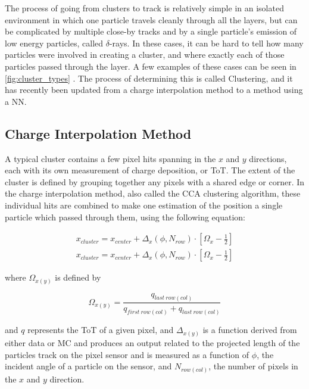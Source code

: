 The process of going from clusters to track is relatively simple in an isolated environment in which one particle travels cleanly through all the layers, but can be complicated by multiple close-by tracks and by a single particle's emission of low energy particles, called $\delta$-rays. In these cases, it can be hard to tell how many particles were involved in creating a cluster, and where exactly each of those particles passed through the layer. A few examples of these cases can be seen in \autoref{fig:cluster_types} . The process of determining this is called Clustering, and it has recently been updated from a charge interpolation method to a method using a \ac{NN}. 

\subsection{Charge Interpolation Method}

A typical cluster contains a few pixel hits spanning in the $x$ and $y$ directions, each with its own measurement of charge deposition, or \ac{ToT}. The extent of the cluster is defined by grouping together any pixels with a shared edge or corner. In the charge interpolation method, also called the \ac{CCA} clustering algorithm, these individual hits are combined to make one estimation of the position a single particle which passed through them, using the following equation: 

\begin{eqnarray}
x_{cluster} = x_{center} + \Delta_x(\phi,N_{row}) \cdot \left[ \Omega_x -\frac{1}{2} \right] \\
\label{eq:analogx}
x_{cluster} = x_{center} + \Delta_x(\phi,N_{row}) \cdot \left[ \Omega_x -\frac{1}{2} \right]
\label{eq:analogy}
\end{eqnarray}

where $\Omega_{x(y)}$ is defined by

\begin{equation}
\Omega_{x(y)} = \frac{q_{last~row(col)}}{q_{first~row(col)} + q_{last~row(col)}}
\end{equation}

and $q$ represents the \ac{ToT} of a given pixel, and $\Delta_{x(y)}$ is a function derived from either data or \ac{MC} and produces an output related to the projected length of the particles track on the pixel sensor and is measured as a function of $\phi$, the incident angle of a particle on the sensor, and $N_{row(col)}$, the number of pixels in the $x$ and $y$ direction. 

